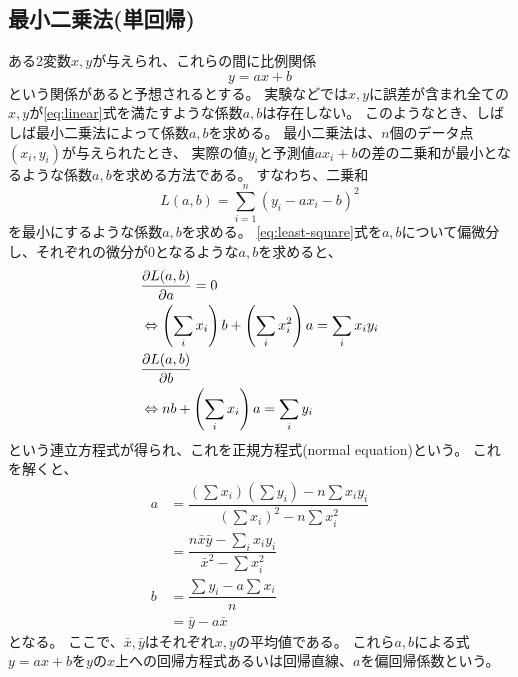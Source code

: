 \subsection{最小二乗法(単回帰)}

ある2変数$x,y$が与えられ、これらの間に比例関係
\begin{equation}\label{eq:linear}
	y = ax + b
\end{equation}
という関係があると予想されるとする。
実験などでは$x,y$に誤差が含まれ全ての$x,y$が\ref{eq:linear}式を満たすような係数$a,b$は存在しない。
このようなとき、しばしば最小二乗法によって係数$a,b$を求める。
最小二乗法は、$n$個のデータ点$(x_i,y_i)$が与えられたとき、
実際の値$y_i$と予測値$ax_i+b$の差の二乗和が最小となるような係数$a,b$を求める方法である。
すなわち、二乗和
\begin{equation}\label{eq:least-square}
	L(a,b) = \sum_{i=1}^{n} (y_i - ax_i - b)^2
\end{equation}
を最小にするような係数$a,b$を求める。
\ref{eq:least-square}式を$a,b$について偏微分し、それぞれの微分が0となるような$a,b$を求めると、
\begin{equation}\label{eq:normal-equation}
	\begin{split}
		 & \pdv{L(a, b)}{a}                                                               = 0              \\
		 & \Leftrightarrow   \left( \sum_i x_i  \right) b + \left(\sum_i x_i^2 \right) a  = \sum_i x_i y_i \\
		 & \pdv{L(a, b)}{b}                                                                                \\
		 & \Leftrightarrow nb + \left( \sum_i x_i \right) a = \sum_i y_i
	\end{split}
\end{equation}
という連立方程式が得られ、これを正規方程式(normal equation)という。
これを解くと、
\begin{equation}\label{eq:regression-equation}
	\begin{split}
		a & = \dfrac{\left(\sum x_i\right)\left(\sum y_i\right) - n\sum x_i y_i}{\left(\sum x_i \right)^2 - n \sum x_i^2} \\
		  & = \dfrac{n \bar{x}\bar{y} - \sum_i x_iy_i}{\bar{x}^2 - \sum x_i^2}                                            \\
		b & = \dfrac{\sum y_i - a\sum x_i}{n}                                                                             \\
		  & = \bar{y} - a\bar{x}
	\end{split}
\end{equation}
となる。
ここで、$\bar{x},\bar{y}$はそれぞれ$x,y$の平均値である。
これら$a,b$による式$y=ax+b$を$y$の$x$上への回帰方程式あるいは回帰直線、$a$を偏回帰係数という。


